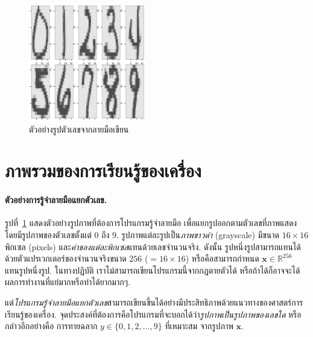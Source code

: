 %
\begin{figure}
\begin{center}
\includegraphics[width=2.0in]
{01Intro/zipdigits.eps}
\end{center}
\caption{ตัวอย่างรูปตัวเลขจากลายมือเขียน}
\label{fig: example ZIP image digits}
\end{figure}
%


\section{ภาพรวมของการเรียนรู้ของเครื่อง}
\label{sec: ML overview}

\paragraph{ตัวอย่างการรู้จำลายมือแยกตัวเลข.}

รูปที่~\ref{fig: example ZIP image digits} แสดงตัวอย่างรูปภาพที่ต้องการโปรแกรมรู้จำลายมือ เพื่อแยกรูปออกตามตัวเลขที่ภาพแสดง โดยมีรูปภาพของตัวเลขตั้งแต่ $0$ ถึง $9$.
รูปภาพแต่ละรูปเป็น\textit{ภาพขาวดำ} (grayscale) มีขนาด $16 \times 16$ พิกเซล (pixels) 
และ\textit{ค่าของแต่ละพิกเซล}แทนด้วยเลขจำนวนจริง.
ดังนั้น รูปหนึ่งรูปสามารถแทนได้ด้วยตัวแปรเวกเตอร์ของจำนวนจริงขนาด $256$ ($=16 \times 16$) 
หรือคือสามารถกำหนด $\mathbf{x} \in \mathbb{R}^{256}$ แทนรูปหนึ่งรูป.
ในทางปฏิบัติ เราไม่สามารถเขียนโปรแกรมนี้จากกฎตายตัวได้ 
หรือถ้าได้ก็อาจจะได้ผลการทำงานที่แย่มากหรือทำได้ยากมากๆ.

แต่\textit{โปรแกรมรู้จำลายมือแยกตัวเลข}สามารถเขียนขึ้นได้อย่างมีประสิทธิภาพด้วยแนวทางของศาสตร์การเรียนรู้ของเครื่อง.
จุดประสงค์ที่ต้องการคือโปรแกรมที่จะบอกได้ว่า\textit{รูปภาพเป็นรูปภาพของเลขใด} 
หรือกล่าวอีกอย่างคือ การทายฉลาก $y \in \{0, 1, 2, \ldots, 9\}$ ที่เหมาะสม จากรูปภาพ $\mathbf{x}$.


